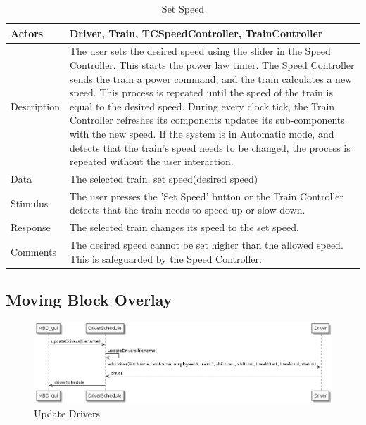 \documentclass[]{article}
\begin{document}
\begin{table}[H]
	\centering
	\caption{Set Speed}
	\begin{tabular}{|l|l|}
		\hline
		Actors & \parbox[t]{10cm}{Driver, Train, TCSpeedController, TrainController} \\ \hline
		Description & \parbox[t]{10cm}{The user sets the desired speed using the slider in the Speed Controller. This starts the power law timer. The Speed Controller sends the train a power command, and the train calculates a new speed. This process is repeated until the speed of the train is equal to the desired speed. During every clock tick, the Train Controller refreshes its components updates its sub-components with the new speed. If  the system is in Automatic mode, and detects that the train's speed needs to be changed, the process is repeated without the user interaction. } \\ \hline
		Data &  \parbox[t]{10cm}{The selected train, set speed(desired speed)} \\ \hline
		Stimulus &  \parbox[t]{10cm}{ The user presses the 'Set Speed' button or the Train Controller detects that the train needs to speed up or slow down. } \\ \hline
		Response & \parbox[t]{10cm}{The selected train changes its speed to the set speed. }\\ \hline
		Comments & \parbox[t]{10cm}{The desired speed cannot be set higher than the allowed speed. This is safeguarded by the Speed Controller. }  \\ \hline
	\end{tabular}
\end{table}


\subsection{Moving Block Overlay}

	\begin{figure}[H]
		\centering
		\includegraphics[width=\textwidth]{updateDrivers.png}
		\caption{Update Drivers}
	\end{figure}
	
\end{document}
